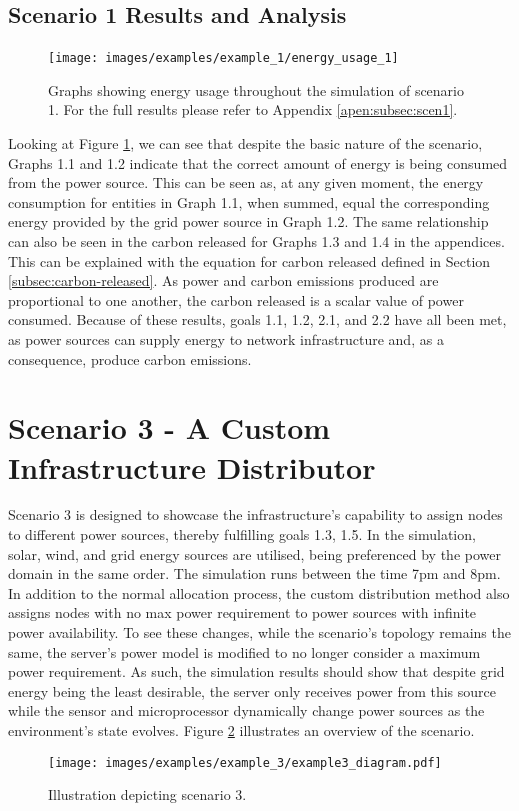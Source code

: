 \documentclass{l4proj}
\begin{document}
\subsection{Scenario 1 Results and Analysis}
\begin{figure}[h]
    \centering
    \texttt{[image: images/examples/example\_1/energy\_usage\_1]}
    ~
    \caption{Graphs showing energy usage throughout the simulation of scenario 1. For the full results please refer to Appendix \ref{apen:subsec:scen1}.}
    \label{fig:example1_results_energy}
\end{figure}
Looking at Figure \ref{fig:example1_results_energy}, we can see that despite the basic nature of the scenario, Graphs 1.1 and 1.2 indicate that the correct amount of energy is being consumed from the power source.
This can be seen as, at any given moment, the energy consumption for entities in Graph 1.1, when summed, equal the corresponding energy provided by the grid power source in Graph 1.2.
The same relationship can also be seen in the carbon released for Graphs 1.3 and 1.4 in the appendices.
This can be explained with the equation for carbon released defined in Section \ref{subsec:carbon-released}.
As power and carbon emissions produced are proportional to one another, the carbon released is a scalar value of power consumed.
Because of these results, goals 1.1, 1.2, 2.1, and 2.2 have all been met, as power sources can supply energy to network infrastructure and, as a consequence, produce carbon emissions.

\section{Scenario 3 - A Custom Infrastructure Distributor}\label{eval:subsec:scenario3}
Scenario 3 is designed to showcase the infrastructure's capability to assign nodes to different power sources, thereby fulfilling goals 1.3, 1.5.
In the simulation, solar, wind, and grid energy sources are utilised, being preferenced by the power domain in the same order.
The simulation runs between the time 7pm and 8pm.
In addition to the normal allocation process, the custom distribution method also assigns nodes with no max power requirement to power sources with infinite power availability.
To see these changes, while the scenario's topology remains the same, the server's power model is modified to no longer consider a maximum power requirement.
As such, the simulation results should show that despite grid energy being the least desirable, the server only receives power from this source while the sensor and microprocessor dynamically change power sources as the environment's state evolves.
Figure \ref{fig:example3_diagram} illustrates an overview of the scenario.
\begin{figure}[h]
    \centering
    \texttt{[image: images/examples/example\_3/example3\_diagram.pdf]}
    \caption{Illustration depicting scenario 3.}
    \label{fig:example3_diagram}
\end{figure}
\end{document}
